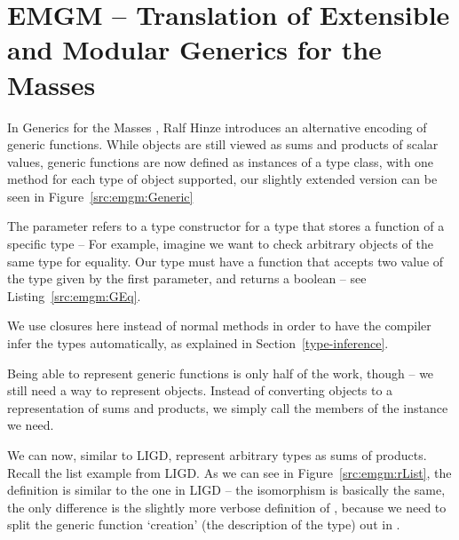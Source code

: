 \section{EMGM -- Translation of Extensible and Modular Generics for the Masses}


In Generics for the Masses \cite{GM}, Ralf Hinze introduces an alternative
encoding of generic functions. While objects are still viewed as sums and
products of scalar values, generic functions are now defined as instances
of a  type class, with one method for each type of object
supported, our slightly extended version can be seen in Figure~\ref{src:emgm:Generic}

The parameter  refers to a type constructor for a type that stores
a function of a specific type -- For example, imagine we want to check
arbitrary objects of the same type for equality. Our type  must have a function that accepts two
value of the type given by the first parameter, and returns a boolean
-- see Listing~\ref{src:emgm:GEq}.


We use closures here instead of normal methods in order to have the
compiler infer the types automatically, as explained in Section~\ref{type-inference}.

Being able to represent generic functions is only half of the work, though
-- we still need a way to represent objects. Instead of converting objects
to a representation of sums and products, we simply call the members of
the  instance we need.



We can now, similar to  LIGD, represent arbitrary types as sums of products.
Recall the list example from LIGD.
As we can see in Figure~\ref{src:emgm:rList}, the definition is similar to
the one in LIGD
-- the isomorphism is basically the same, the only difference is the slightly
more verbose definition of , because we need to split the generic
function `creation' (the description of the type) out in .


